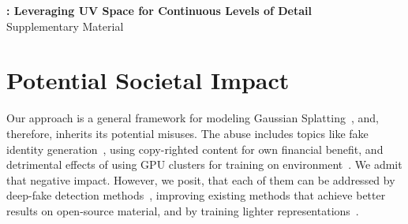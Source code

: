 \clearpage
{
  \vspace{2.0em}
  \centering
  \Large
  \textbf{\clog: Leveraging UV Space for Continuous Levels of Detail} \\
  \vspace{0.5em}
  Supplementary Material \\ \vspace{1.0em} }

\section{Potential Societal Impact} Our approach is a general framework for
  modeling Gaussian Splatting~\cite{kerbl20233d}, and, therefore, inherits its
  potential misuses.
  The abuse includes topics like fake identity generation~\cite{zhang2024e3gen},
  using copy-righted content for own financial benefit, and detrimental effects
  of using GPU clusters for training on environment~\cite{bouza2023estimate}.
  We admit that negative impact.
  However, we posit, that each of them can be addressed by deep-fake detection
  methods~\cite{pei2024deepfake}, improving existing methods that achieve better
  results on open-source material, and by training lighter
  representations~\cite{lee2024compact,niedermayr2024compressed,fang2024mini}.

